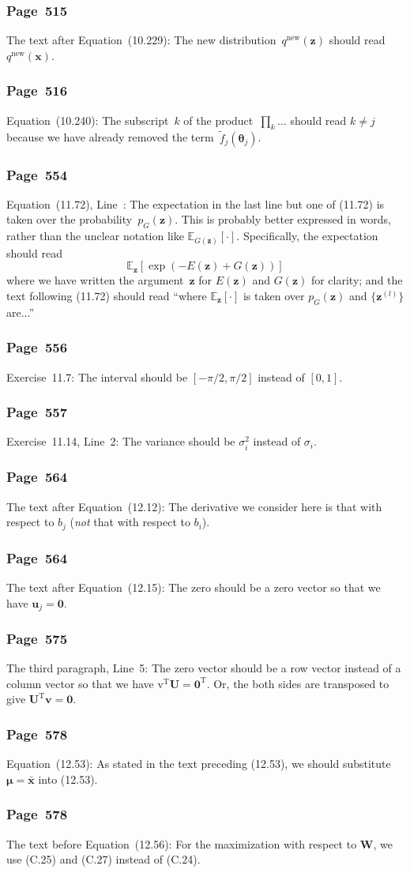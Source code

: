 \documentclass[12pt,a4paper]{article}
\newcommand{\erratum}[1]{\subsubsection*{#1}}
\begin{document}
\erratum{Page~515}
The text after Equation~(10.229):
The new distribution~$q^{\text{new}}(\mathbf{z})$ should read $q^{\text{new}}(\mathbf{x})$.

\erratum{Page~516}
Equation~(10.240):
The subscript~$k$ of the product~$\displaystyle\prod_{k} \dots$ should read $k \neq j$
because we have already removed the term~$\widetilde{f}_j(\bm{\theta}_j)$.

\erratum{Page~554}
Equation~(11.72), Line~:
The expectation in the last line but one of (11.72) is taken over
the probability~$p_{G}(\mathbf{z})$.
This is probably better expressed in words, rather than the unclear notation like
$\mathbb{E}_{G(\mathbf{z})}[\cdot]$.
Specifically, the expectation should read
\begin{equation}
\mathbb{E}_{\mathbf{z}} \left[ \exp\left(-E(\mathbf{z}) + G(\mathbf{z}) \right) \right]
\end{equation}
where we have written the argument~$\mathbf{z}$ for $E(\mathbf{z})$ and $G(\mathbf{z})$
for clarity; and
the text following (11.72) should read ``where $\mathbb{E}_{\mathbf{z}}[\cdot]$ is taken over
$p_{G}(\mathbf{z})$ and $\{ \mathbf{z}^{(l)} \}$ are...''

\erratum{Page~556}
Exercise~11.7:
The interval should be $\left[ -\pi/2 , \pi/2 \right]$ instead of $[0, 1]$.

\erratum{Page~557}
Exercise~11.14, Line~2:
The variance should be $\sigma_i^2$ instead of $\sigma_i$.

\erratum{Page~564}
The text after Equation~(12.12):
The derivative we consider here is that with respect to $b_j$
(\emph{not} that with respect to $b_i$).

\erratum{Page~564}
The text after Equation~(12.15):
The zero should be a zero vector so that we have $\mathbf{u}_j = \mathbf{0}$.

\erratum{Page~575}
The third paragraph, Line~5:
The zero vector should be a row vector instead of a column vector so that we have
$\mathrm{v}^{\operatorname{T}}\mathbf{U} = \mathbf{0}^{\operatorname{T}}$.
Or, the both sides are transposed to give $\mathbf{U}^{\operatorname{T}}\mathbf{v} = \mathbf{0}$.

\erratum{Page~578}
Equation~(12.53):
As stated in the text preceding (12.53),
we should substitute $\bm{\mu} = \bar{\mathbf{x}}$ into (12.53).

\erratum{Page~578}
The text before Equation~(12.56):
For the maximization with respect to $\mathbf{W}$, we use (C.25) and (C.27) instead of (C.24).
\end{document}
